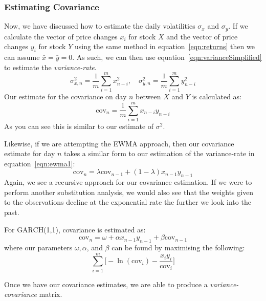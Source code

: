 \documentclass[../background_research.tex]{subfiles}
\begin{document}
\subsubsection{Estimating Covariance}

Now, we have discussed how to estimate the daily volatilities $\sigma_x$ and $\sigma_y$.
If we calculate the vector of price changes $x_i$ for stock $X$ and the vector of price changes $y_i$ for stock $Y$ using the same method in equation~\ref{eqn:returns} then we can assume $\bar{x}=\bar{y} = 0$.
As such, we can then use equation~\ref{eqn:varianceSimplified} to estimate the \textit{variance-rate}.
\begin{equation}
    \label{eqn:variancexy}
    \sigma^2_{x,n}={\frac{1}{m}}\sum_{i=1}^mx^2_{n-i},\quad \sigma^2_{y,n}={\frac{1}{m}}\sum_{i=1}^my^2_{n-i}
\end{equation}
Our estimate for the covariance on day $n$ between $X$ and $Y$ is calculated as:
\begin{equation}
    \label{eqn:covariancexy}
    \text{cov}_n={\frac{1}{m}}\sum_{i=1}^mx_{n-i}y_{n-i}
\end{equation}
As you can see this is similar to our estimate of $\sigma^2$.

Likewise, if we are attempting the EWMA approach, then our covariance estimate for day $n$ takes a similar form to our estimation of the variance-rate in equation~\ref{eqn:ewma1}:
\begin{equation}
    \label{eqn:covarianceEWMA}
    \text{cov}_n= \lambda{\text{cov}_{n-1}} + (1-\lambda)x_{n-1}y_{n-1}
\end{equation}
Again, we see a recursive approach for our covariance estimation.
If we were to perform another substitution analysis, we would also see that the weights given to the observations decline at the exponential rate the further we look into the past.

For GARCH(1,1), covariance is estimated as:
\begin{equation}
    \label{eqn:covarianceGARCH}
    \text{cov}_n=\omega+\alpha{x_{n-1}}y_{n-1}+\beta\text{cov}_{n-1}
\end{equation}
where our parameters $\omega, \alpha$, and $\beta$ can be found by maximising the following:
\begin{equation}
    \label{eqn:maxlikelihood2}
    \sum_{i=1}^m\Bigg[-\ln({\text{cov}_i}) - \frac{x_i{y_i}}{\text{cov}_i}\Bigg]
\end{equation}

Once we have our covariance estimates, we are able to produce a \textit{variance-covariance} matrix.
\end{document}
